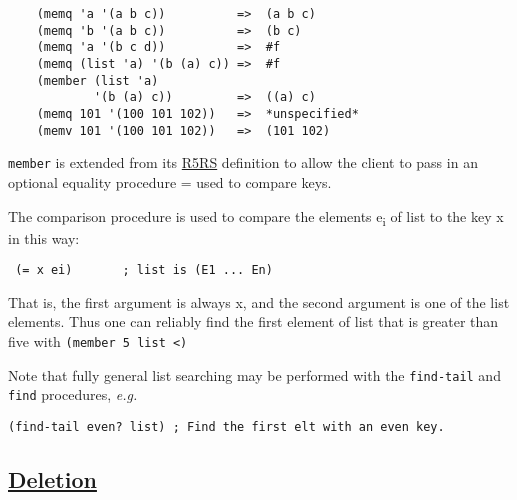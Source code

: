 \begin{description}
\begin{verbatim}
    (memq 'a '(a b c))          =>  (a b c)
    (memq 'b '(a b c))          =>  (b c)
    (memq 'a '(b c d))          =>  #f
    (memq (list 'a) '(b (a) c)) =>  #f
    (member (list 'a)
            '(b (a) c))         =>  ((a) c)
    (memq 101 '(100 101 102))   =>  *unspecified*
    (memv 101 '(100 101 102))   =>  (101 102)
\end{verbatim}

\texttt{member} is extended from its \protect\hyperlink{R5RS}{R5RS}
definition to allow the client to pass in an optional equality procedure
= used to compare keys.

The comparison procedure is used to compare the elements
e\textsubscript{i} of list to the key x in this way:

\texttt{\ (=\ x\ ei)\ \ \ \ \ \ \ ;\ list\ is\ (E1\ ...\ En)}

That is, the first argument is always x, and the second argument is one
of the list elements. Thus one can reliably find the first element of
list that is greater than five with
\texttt{(member\ 5\ list\ \textless{})}

Note that fully general list searching may be performed with the
\texttt{find-tail} and \texttt{find} procedures, \emph{e.g.}

\begin{verbatim}
(find-tail even? list) ; Find the first elt with an even key.
\end{verbatim}
\end{description}

\subsection{\texorpdfstring{\href{}{Deletion}}{Deletion}}\label{deletion}


